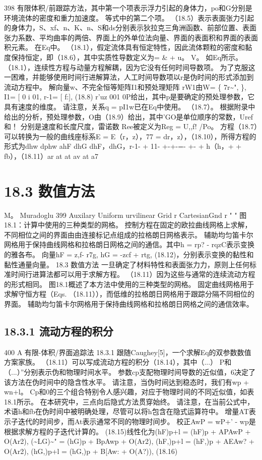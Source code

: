 \documentclass[UTF8,11pt,a4paper,openany,fontset=fandol]{ctexbook}
\begin{document}
398 有限体积/前跟踪方法，其中第一个项表示浮力引起的身体力，po和G分别是环境流体的密度和重力加速度。 等式中的第二个项。 （18.5）表示表面张力引起的身体力，S、xf、n、K、n、S和ds分别表示狄拉克三角洲函数、前部位置、表面张力系数、平均曲率的两倍、界面上的外单位法向量、界面的表面积和界面的表面积元素。 在Eq中。 （18.1），假定流体具有恒定特性，因此流体颗粒的密度和黏度保持恒定，即（18.6），其中实质性导数定义为= \& + u。 V。 如Eq所示。 （18.1），连续性方程与动量方程解耦，因为它没有任何时间导数项。 为了克服这一困难，并能够使用时间行进解算法，人工时间导数项以r是伪时间的形式添加到流动方程中。 解向量w、不完全恒等矩阵I1和预处理矩阵 rW1由W= \{ 7r\textasciitilde{}", \}, I1= [ 0 i 01, r-1= [ f:], (18.8) r'uz 001 0P给出，其中p是要确定的预处理参数，它具有速度的维度。 请注意，关系q = pI1w已在Eq中使用。 （18.7）。 根据附录中给出的分析，预处理参数，O由（18.9）给出，其中'GO是单位顺序的常数，Uref和！ 分别是速度和长度尺度，雷诺数 Ree被定义为Reg = U,,f! /Po。 方程（18.7）可以转换为一般的曲线座标系E = E（r，z），77 = dr，z），（18.10），所得方程的形式为dhw dphw ahF dhG dhF，dhG，r-1- + 11- +-+-=- +- + h（h，+ + fb），（18.11）ar at at av at a7

\section{18.3 数值方法}
M。 Muradoglu 399 Auxilary Uniform urvilinear Grid r CartesianGnd r " " 图18.1：计算中使用的三种类型的网格。 控制方程在固定的欧拉曲线网格上求解，不同相位之间的界面由由连接标记点组成的拉格朗日网格表示。 辅助均匀笛卡尔网格用于保持曲线网格和拉格朗日网格之间的通信。其中h = rp? - rqzC表示变换的雅各布。 向量hF = z,f- r7g, hG = -zcf + rtg, (18.12)，分别表示变换的黏性和黏性通量向量。 18.3 数值方法 一旦确定了材料特性和表面张力力，原则上任何标准时间行进算法都可以用于求解方程。 （18.11）因为这些与通常的连续流动方程的形式相同。 图18.1概述了本方法中使用的三种类型的网格。 固定曲线网格用于求解守恒方程（Eqs. （18.11）），而低维的拉格朗日网格用于跟踪分隔不同相位的界面。 辅助均匀笛卡尔网格用于保持曲线网格和拉格朗日网格之间的通信效率。

\subsection{18.3.1 流动方程的积分}
400 A 有限-体积/界面追踪法 18.3.1 跟随Caughey[5]，一个求解Eq的双参数数值方案家族。 （18.11）可以写成流动方程的积分（18.14），其中（...） P和（...）”分别表示伪和物理时间水平。 参数cp支配物理时间导数的近似值，6决定了该方法在伪时间中的隐含性水平。 请注意，当伪时间达到稳态时，我们有wp + wn+l。 Cp和0的三个组合特别令人感兴趣，对应于物理时间的不同近似值，如表18.1所示。 在本研究中，三点向后隐式方法贯穿始终。 请注意，在当前公式中，术语h和fb在伪时间中被明确处理，尽管可以将h包含在隐式运算符中。 增量AT表示子迭代的时间步，而At表示通常不同的物理时间步。 校正AwP = wP+' - wp是根据求解方程的子迭代计算的。 (18.15)线性化为(hF)p+l = (hF)p + APAwP + O(Ar2), (\textasciitilde{}LG)\textasciitilde{}" = (hG)p + BpAwp + O(Ar2), (hF,)p+l = (hF,)p + AEAw? + O(Ar2), (hG,)p+l = (hG,)p + B[Aw: + O(A?)), (18.16)
\end{document}
